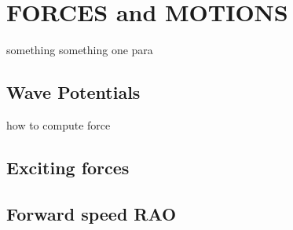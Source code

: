 \chapter{FORCES and MOTIONS}
something something one para
\section{Wave Potentials}
how to compute force 
\section{Exciting forces}
\section{Forward speed RAO}